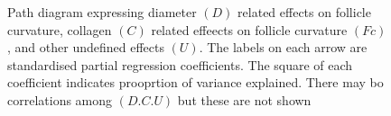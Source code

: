 \begin{figure}[!h]
\caption{Path diagram expressing diameter $(D)$ related effects on follicle curvature, collagen $(C)$ related effeects on follicle curvature $(Fc)$, and other undefined effects $(U)$. The labels on each arrow are standardised partial regression coefficients. The square of each coefficient indicates prooprtion of variance explained. There may bo correlations among $(D.C.U)$ but these are not shown}
\label{fig:path}
\end{figure}
%
